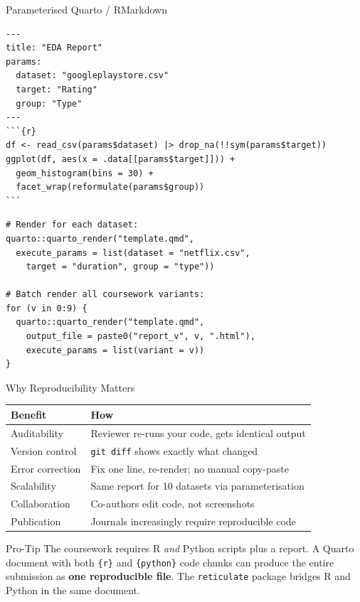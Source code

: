 \documentclass[10pt]{beamer}
\begin{document}
\begin{frame}[fragile]{Parameterised Quarto / RMarkdown}
\begin{lstlisting}[style=yaml]
---
title: "EDA Report"
params:
  dataset: "googleplaystore.csv"
  target: "Rating"
  group: "Type"
---
```{r}
df <- read_csv(params$dataset) |> drop_na(!!sym(params$target))
ggplot(df, aes(x = .data[[params$target]])) +
  geom_histogram(bins = 30) +
  facet_wrap(reformulate(params$group))
```
\end{lstlisting}
  \vspace{4pt}
\begin{lstlisting}[style=rstyle]
# Render for each dataset:
quarto::quarto_render("template.qmd",
  execute_params = list(dataset = "netflix.csv",
    target = "duration", group = "type"))

# Batch render all coursework variants:
for (v in 0:9) {
  quarto::quarto_render("template.qmd",
    output_file = paste0("report_v", v, ".html"),
    execute_params = list(variant = v))
}
\end{lstlisting}
\end{frame}

\begin{frame}{Why Reproducibility Matters}
  \centering
  \begin{tabular}{lp{5.5cm}}
    \toprule
    \textbf{Benefit} & \textbf{How} \\
    \midrule
    Auditability & Reviewer re-runs your code, gets identical output \\
    Version control & \texttt{git diff} shows exactly what changed \\
    Error correction & Fix one line, re-render; no manual copy-paste \\
    Scalability & Same report for 10 datasets via parameterisation \\
    Collaboration & Co-authors edit code, not screenshots \\
    Publication & Journals increasingly require reproducible code \\
    \bottomrule
  \end{tabular}
  \vspace{6pt}
  \begin{alertblock}{Pro-Tip}
    The coursework requires R \emph{and} Python scripts plus a report.
    A Quarto document with both \texttt{\{r\}} and \texttt{\{python\}}
    code chunks can produce the entire submission as \textbf{one
    reproducible file}. The \texttt{reticulate} package bridges R and
    Python in the same document.
  \end{alertblock}
\end{frame}
\end{document}
